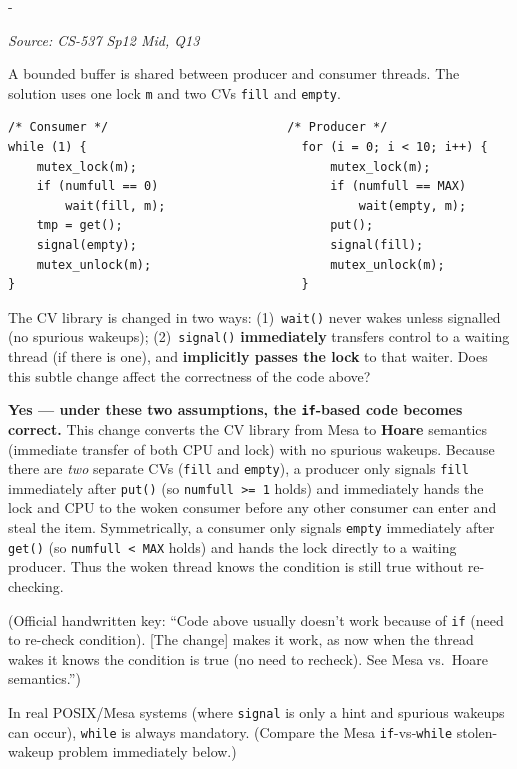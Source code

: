 \documentclass[11pt,a4paper]{article}
\makeatletter
\newcommand{\keepspace}[1]{\par\penalty-100\begingroup
  \setlength{\dimen@}{#1}\dimen@ii\pagegoal\advance\dimen@ii-\pagetotal
  \ifdim\dimen@>\dimen@ii\ifdim\dimen@ii>\z@\vfil\fi\break\fi\endgroup}
\newcounter{qn}[section]
\newenvironment{Qn}[4]{%
  \refstepcounter{qn}\keepspace{7\baselineskip}%
  \begin{tcolorbox}[qboxstyle, title={Q\thesection.\theqn\ \ [#1 \textbar\ #2]\ \ #4}]%
  {\footnotesize\color{g3}\textit{Source: #3}}\par\smallskip%
}{%
  \end{tcolorbox}%
}
\newenvironment{Sol}{%
  \begin{tcolorbox}[sboxstyle, title={Solution}]%
}{%
  \end{tcolorbox}\vspace{0.35em}%
}
\makeatother
\begin{document}
\begin{Qn}{Hard}{Lect 18}{CS-537 Sp12 Mid, Q13}{Hoare lock-handoff: does \texttt{if} suddenly work?}
A bounded buffer is shared between producer and consumer threads. The
solution uses one lock \texttt{m} and two CVs \texttt{fill} and
\texttt{empty}.
\begin{lstlisting}[numbers=none]
/* Consumer */                         /* Producer */
while (1) {                              for (i = 0; i < 10; i++) {
    mutex_lock(m);                           mutex_lock(m);
    if (numfull == 0)                        if (numfull == MAX)
        wait(fill, m);                           wait(empty, m);
    tmp = get();                             put();
    signal(empty);                           signal(fill);
    mutex_unlock(m);                         mutex_unlock(m);
}                                        }
\end{lstlisting}
The CV library is changed in two ways: (1)~\texttt{wait()} never wakes
unless signalled (no spurious wakeups); (2)~\texttt{signal()}
\textbf{immediately} transfers control to a waiting thread (if there is
one), and \textbf{implicitly passes the lock} to that waiter. Does this
subtle change affect the correctness of the code above?
\end{Qn}
\begin{Sol}
\textbf{Yes --- under these two assumptions, the \texttt{if}-based code becomes correct.}
This change converts the CV library from Mesa to \textbf{Hoare} semantics (immediate transfer of both CPU and lock) with no spurious wakeups. Because there are \emph{two} separate CVs (\texttt{fill} and \texttt{empty}), a producer only signals \texttt{fill} immediately after \texttt{put()} (so \texttt{numfull >= 1} holds) and immediately hands the lock and CPU to the woken consumer before any other consumer can enter and steal the item. Symmetrically, a consumer only signals \texttt{empty} immediately after \texttt{get()} (so \texttt{numfull < MAX} holds) and hands the lock directly to a waiting producer. Thus the woken thread knows the condition is still true without re-checking.

(Official handwritten key: ``Code above usually doesn't work because of \texttt{if} (need to re-check condition). [The change] makes it work, as now when the thread wakes it knows the condition is true (no need to recheck). See Mesa vs.\ Hoare semantics.'')

In real POSIX/Mesa systems (where \texttt{signal} is only a hint and spurious wakeups can occur), \texttt{while} is always mandatory. (Compare the Mesa \texttt{if}-vs-\texttt{while} stolen-wakeup problem immediately below.)
\end{Sol}
\end{document}
